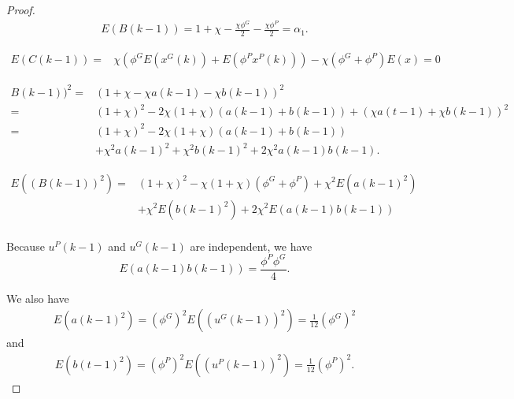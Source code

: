 \begin{proof}
\begin{equation}
\label{eq:a_t_mean}
\begin{aligned}
E( B(k-1) ) = 1 + \chi - \frac{ \chi \phi^{G} }{2} - \frac{ \chi \phi^{P} }{2} = \alpha_{1}.
\end{aligned}
\end{equation}

\begin{equation}
\label{eq:b_t_mean}
\begin{aligned}
E( C(k-1) )
 = & \chi ( \phi^{G} E( x^{G}(k) ) + E( \phi^{P} x^{P}(k) ) )  - \chi ( \phi^{G} + \phi^{P} ) E(x)
 = 0
\end{aligned}
\end{equation}

\begin{equation}
\begin{aligned}
B(k-1) )^{2} 
= & ( 1 + \chi - \chi a(k-1) - \chi b(k-1) )^{2} \\
= & (1 + \chi)^{2} - 2 \chi(1 + \chi) ( a(k-1) + b(k-1) ) + ( \chi a(t-1) + \chi  b(k-1) )^{2} \\
= & (1 + \chi)^{2} - 2 \chi(1 + \chi) ( a(k-1) + b(k-1) ) \\
& + \chi^{2} a(k-1)^{2} + \chi^{2} b(k-1)^{2} + 2 \chi^{2} a(k-1) b(k-1).
\end{aligned} 
\end{equation}

\begin{equation}
\label{eq:a_t_2_mean}
\begin{aligned}
E( ( B(k-1) )^{2} ) = & (1 + \chi)^{2} - \chi(1 + \chi) ( \phi^{G} + \phi^{P} )  + \chi^{2} E( a( k-1 )^{2} ) \\
& + \chi^{2} E( b( k-1 )^{2} )
+ 2 \chi^{2} E( a( k-1 ) b( k-1 ) ) \\
\end{aligned}
\end{equation}

Because $ u^{P}(k-1) $ and $ u^{G}(k-1) $ are independent,
we have
\begin{equation}
E( a(k-1) b(k-1) ) = \frac{ \phi^{P} \phi^{G} }{4}.
\end{equation}

We also have
\begin{equation}
\begin{aligned}
E( a(k-1)^{2} ) = ( \phi^{G} )^{2} E( (u^{G}(k-1))^{2} ) = \frac{1}{12} ( \phi^{G} )^{2}
\end{aligned}
\end{equation}
and
\begin{equation}
\begin{aligned}
E( b(t-1)^{2} ) = ( \phi^{P} )^{2} E( (u^{P}(k-1))^{2} ) = \frac{1}{12} ( \phi^{P} )^{2}.
\end{aligned}
\end{equation} 


\end{proof}

